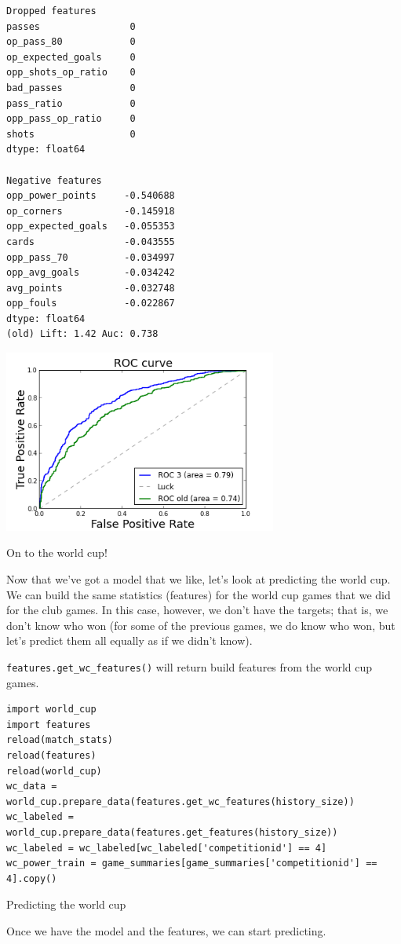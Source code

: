 \documentclass[12pt,fleqn]{article}\usepackage{common}
\begin{document}
\begin{verbatim}
Dropped features
passes                0
op_pass_80            0
op_expected_goals     0
opp_shots_op_ratio    0
bad_passes            0
pass_ratio            0
opp_pass_op_ratio     0
shots                 0
dtype: float64

Negative features
opp_power_points     -0.540688
op_corners           -0.145918
opp_expected_goals   -0.055353
cards                -0.043555
opp_pass_70          -0.034997
opp_avg_goals        -0.034242
avg_points           -0.032748
opp_fouls            -0.022867
dtype: float64
(old) Lift: 1.42 Auc: 0.738
\end{verbatim}

\includegraphics[height=6cm]{doc_en_02.png}


On to the world cup!

Now that we've got a model that we like, let's look at predicting the world
cup. We can build the same statistics (features) for the world cup games
that we did for the club games. In this case, however, we don't have the
targets; that is, we don't know who won (for some of the previous games, we
do know who won, but let's predict them all equally as if we didn't know).

\verb!features.get_wc_features()! will return build features from the world
cup games.

\begin{verbatim}
import world_cup
import features
reload(match_stats)
reload(features)
reload(world_cup)
wc_data = world_cup.prepare_data(features.get_wc_features(history_size))
wc_labeled = world_cup.prepare_data(features.get_features(history_size))
wc_labeled = wc_labeled[wc_labeled['competitionid'] == 4]
wc_power_train = game_summaries[game_summaries['competitionid'] == 4].copy()
\end{verbatim}

Predicting the world cup

Once we have the model and the features, we can start predicting.
\end{document}
